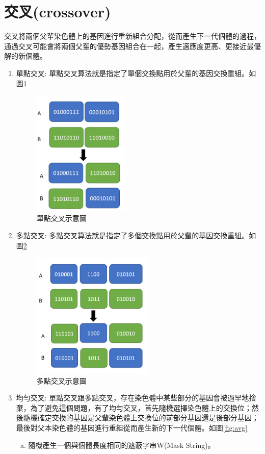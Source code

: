 \section{交叉(crossover)}
交叉將兩個父輩染色體上的基因進行重新組合分配，從而產生下一代個體的過程，通過交叉可能會將兩個父輩的優勢基因組合在一起，產生適應度更高、更接近最優解的新個體。

\begin{enumerate}
	\item
	      單點交叉:
	      單點交叉算法就是指定了單個交換點用於父輩的基因交換重組。如圖\ref{fig:SinglePointCross}
	      \begin{figure}[H]
		      \centerline{\includegraphics[height=6cm]{pic/one.PNG}}
		      \caption{單點交叉示意圖}
		      \label{fig:SinglePointCross}
	      \end{figure}

	\item
	      多點交叉:
	      多點交叉算法就是指定了多個交換點用於父輩的基因交換重組。如圖\ref{fig:MultiPointCross}
	      \begin{figure}[H]
		      \centerline{\includegraphics[height=6cm]{pic/TWO.PNG}}
		      \caption{多點交叉示意圖}
		      \label{fig:MultiPointCross}
	      \end{figure}

	\item
	      均勻交叉:
	      單點交叉跟多點交叉，存在染色體中某些部分的基因會被過早地捨棄，為了避免這個問題，有了均勻交叉，首先隨機選擇染色體上的交換位；然後隨機確定交換的基因是父輩染色體上交換位的前部分基因還是後部分基因；最後對父本染色體的基因進行重組從而產生新的下一代個體。如圖\ref{fig:avg}
	      \begin{enumerate}[(a)]
		      \item
		            隨機產生一個與個體長度相同的遮蔽字串W(Mask String)。


\end{enumerate}
\end{enumerate}
